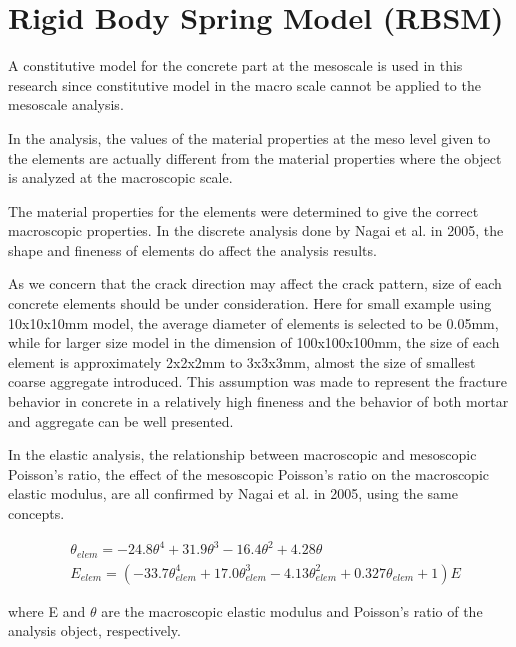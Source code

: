 \section{Rigid Body Spring Model (RBSM)}

A constitutive model for the concrete part at the mesoscale is used in this research since constitutive model in the macro scale cannot be applied to the mesoscale analysis.

In the analysis, the values of the material properties at the meso level given to the elements are actually different from the material properties where the object is analyzed at the macroscopic scale.

The material properties for the elements were determined to give the correct macroscopic properties.  In the discrete analysis done by Nagai et al. in 2005, the shape and fineness of elements do affect the analysis results.

As we concern that the crack direction may affect the crack pattern, size of each concrete elements should be under consideration. Here for small example using 10x10x10mm model, the average diameter of elements is selected to be 0.05mm, while for larger size model in the dimension of 100x100x100mm, the size of each element is approximately 2x2x2mm to 3x3x3mm, almost the size of smallest coarse aggregate introduced. This assumption was made to represent the fracture behavior in concrete in a relatively high fineness and the behavior of both mortar and aggregate can be well presented.

In the elastic analysis, the relationship between macroscopic and mesoscopic Poisson's ratio, the effect of the mesoscopic Poisson's ratio on the macroscopic elastic modulus, are all confirmed by Nagai et al. in 2005, using the same concepts.

\begin{equation}
  \begin{aligned}
  &\theta_{elem} = -24.8\theta^4+31.9\theta^3-16.4\theta^2 +4.28\theta\\
  &E_{elem} = (-33.7\theta_{elem}^4 + 17.0\theta_{elem}^3 - 4.13\theta_{elem}^2 + 0.327\theta_{elem} + 1)E
  \end{aligned}
\end{equation}

where E and $\theta$ are the macroscopic elastic modulus and Poisson's ratio of the analysis object, respectively.

